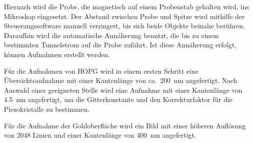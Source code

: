 Hiernach wird die Probe, die magnetisch auf einem Probenstab gehalten wird, ins Mikroskop eingesetzt.
Der Abstand zwischen Probe und Spitze wird mithilfe der Steuerungssoftware manuell verringert, bis sich beide Objekte beinahe berühren.
Daraufhin wird die automatische Annäherung benutzt, die bis zu einem bestimmten Tunnelstrom auf die Probe zufährt.
Ist diese Annäherung erfolgt, können Aufnahmen erstellt werden.

Für die Aufnahmen von HOPG wird in einem ersten Schritt eine Übersichtsaufnahme mit einer Kantenlänge von ca.\ \SI{200}{\nano\meter} angefertigt.
Nach Auswahl einer geeigneten Stelle wird eine Aufnahme mit einer Kantenlänge von \SI{4.5}{\nano\meter} angefertigt, um die Gitterkonstante und den Korrekturfaktor für die Piezokristalle zu bestimmen.

Für die Aufnahme der Goldoberfläche wird ein Bild mit einer höheren Auflösung von \num{2048} Linien und einer Kantenlänge von \SI{400}{\nano\meter} angefertigt.
